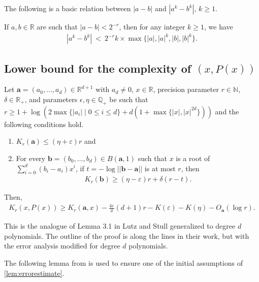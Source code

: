 \documentclass[a4paper,UKenglish,cleveref,autoref,thm-restate]{lipics-v2021}
\newcommand{\N}{\mathbb{N}}
\newcommand{\Q}{\mathbb{Q}}
\newcommand{\R}{\mathbb{R}}
\begin{document}
The following is a basic relation between $|a-b|$ and $|a^k-b^k|$,
$k\ge 1$.
\begin{lemma}\label{lem:degree_d_approx}
  If $a,b\in\R$ are such that $|a-b|<2^{-r}$, then for any integer
  $k \ge 1$, we have
\begin{align*}
\left|a^k - b^k\right| \ <\
2^{-r}k\times\max\{|a|,|a|^k,|b|,|b|^k\}. 
\end{align*}
\end{lemma}



\subsection{Lower bound for the complexity of $(x,P(x))$}


\begin{lemma}\label{lem:errorestimate}
  Let $\mathbf{a}=(a_0,\dots,a_d)\in\R^{d+1}$ with $a_d\ne 0$, $x\in\R$,
  precision parameter $r \in \N$, $\delta \in \R_+$, and parameters
  $\epsilon,\eta\in\Q_+$ be such that
  $r\ge 1+ \log(2\max\{|a_i|\mid 0\le i\le d\} +
  d(1+\max\{|x|,|x|^{2d}\}))$ and the following conditions hold.
\begin{enumerate}[label=(\roman*), itemsep=0pt, topsep=0pt]%
\item $K_r(\mathbf{a})\le(\eta+\varepsilon)r$ and
\item For every $\mathbf{b}=(b_0,\dots,b_d)\in B(\mathbf{a},1)$ such
  that $x$ is a root of $\sum_{i=0}^d (b_i-a_i)x^i$, if
  $t=-\log||\mathbf{b}-\mathbf{a}||$ is at most $r$, then
\begin{align*}
K_r(\mathbf{b})\ge(\eta-\varepsilon)r + \delta(r-t).
\end{align*}
\end{enumerate}
Then, %
\begin{align}\label{ineq:lb_x_Px}
  K_r\left(x,P(x)\right)
  \ge
  K_r(\mathbf{a},x)
  - \frac{4\varepsilon}{\delta}(d+1)r
  -K(\varepsilon)-K(\eta)-O_{\mathbf{a}}(\log r). 
\end{align}
\end{lemma}
This is the analogue of Lemma 3.1 in Lutz and Stull \cite{Stull2020} generalized to degree $d$ polynomials. The outline of the proof is along the lines in their work, but with the error analysis modified for degree $d$ polynomials. 

The following lemma from \cite{Lutz2020e} is used to ensure one of the initial assumptions of \cref{lem:errorestimate}. 
\end{document}
